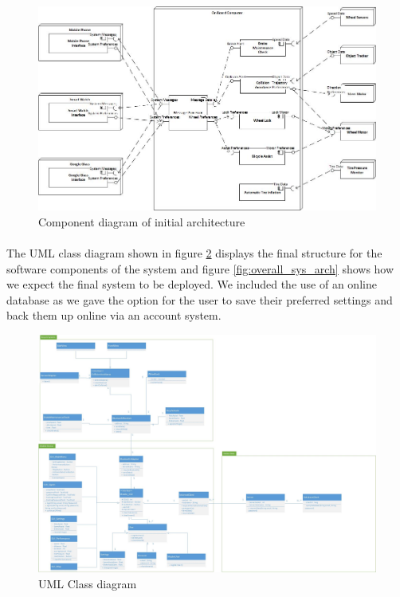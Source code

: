 \documentclass[a4paper]{report}
\begin{document}
{\begin{figure}[h]
\centering
\includegraphics[scale=0.6]{figures/system_architecture/component_arch}
\caption{Component diagram of initial architecture}
\label{fig:component_arch}
\end{figure}

\paragraph{}The UML class diagram shown in figure \ref{fig:UML_Class_Diagram} displays the final structure for the software components of the system and figure \ref{fig:overall_sys_arch} shows how we expect the final system to be deployed. We included the use of an online database as we gave the option for the user to save their preferred settings and back them up online via an account system. 

\begin{figure}[h]
\centering
\includegraphics[scale=0.4, angle=90]{figures/system_architecture/UML_Class_Diagram}
\caption{UML Class diagram}
\label{fig:UML_Class_Diagram}
\end{figure}

}
\end{document}
